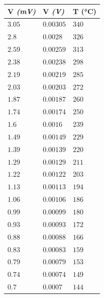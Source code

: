 \documentclass[letterpaper, 12pt]{article}
\begin{document}
\begin{table}[H]
      \begin{tabularx}{\linewidth}{|>{\centering\arraybackslash}X|>{\centering\arraybackslash}X|>{\centering\arraybackslash}X|}
            \hline
            V \textit{(mV)} & V \textit{(V)} & T (°C) \\\hline
            $3.05$          & $0.00305$      & $340$  \\\hline
            $2.8 $          & $0.0028 $      & $326$  \\\hline
            $2.59$          & $0.00259$      & $313$  \\\hline
            $2.38$          & $0.00238$      & $298$  \\\hline
            $2.19$          & $0.00219$      & $285$  \\\hline
            $2.03$          & $0.00203$      & $272$  \\\hline
            $1.87$          & $0.00187$      & $260$  \\\hline
            $1.74$          & $0.00174$      & $250$  \\\hline
            $1.6 $          & $0.0016 $      & $239$  \\\hline
            $1.49$          & $0.00149$      & $229$  \\\hline
            $1.39$          & $0.00139$      & $220$  \\\hline
            $1.29$          & $0.00129$      & $211$  \\\hline
            $1.22$          & $0.00122$      & $203$  \\\hline
            $1.13$          & $0.00113$      & $194$  \\\hline
            $1.06$          & $0.00106$      & $186$  \\\hline
            $0.99$          & $0.00099$      & $180$  \\\hline
            $0.93$          & $0.00093$      & $172$  \\\hline
            $0.88$          & $0.00088$      & $166$  \\\hline
            $0.83$          & $0.00083$      & $159$  \\\hline
            $0.79$          & $0.00079$      & $153$  \\\hline
            $0.74$          & $0.00074$      & $149$  \\\hline
            $0.7 $          & $0.0007 $      & $144$  \\\hline

\end{tabularx}
\end{table}
\end{document}
